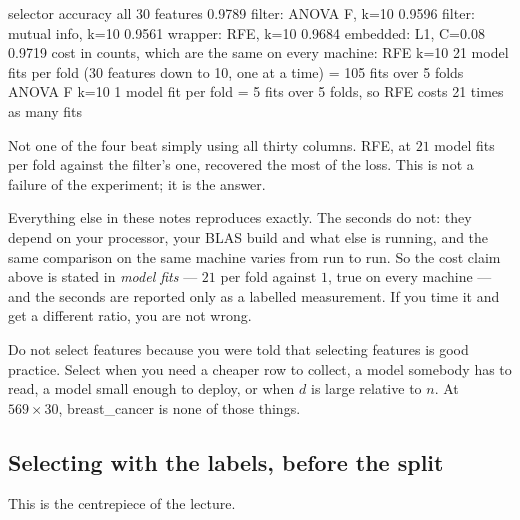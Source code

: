 \documentclass[11pt]{article}
\begin{document}
\begin{codeout}
selector                   accuracy
all 30 features              0.9789
filter: ANOVA F, k=10        0.9596
filter: mutual info, k=10    0.9561
wrapper: RFE, k=10           0.9684
embedded: L1, C=0.08         0.9719
cost in counts, which are the same on every machine:
   RFE k=10      21 model fits per fold (30 features down to 10, one at a
                 time) = 105 fits over 5 folds
   ANOVA F k=10   1 model fit per fold =   5 fits over 5 folds, so RFE costs
                 21 times as many fits
\end{codeout}

Not one of the four beat simply using all thirty columns. RFE, at $21$ model
fits per fold against the filter's one, recovered the most of the loss. This
is not a failure of the experiment; it is the answer.

\begin{caution}
Everything else in these notes reproduces exactly. The seconds do not: they
depend on your processor, your BLAS build and what else is running, and the
same comparison on the same machine varies from run to run. So the cost claim
above is stated in \emph{model fits} --- $21$ per fold against $1$, true on
every machine --- and the seconds are reported only as a labelled measurement.
If you time it and get a different ratio, you are not wrong.
\end{caution}

\begin{caution}
Do not select features because you were told that selecting features is good
practice. Select when you need a cheaper row to collect, a model somebody has
to read, a model small enough to deploy, or when $d$ is large relative to $n$.
At $569 \times 30$, breast\_cancer is none of those things.
\end{caution}

\subsection{Selecting with the labels, before the split}
\label{sec:selectleak}

This is the centrepiece of the lecture.
\end{document}
